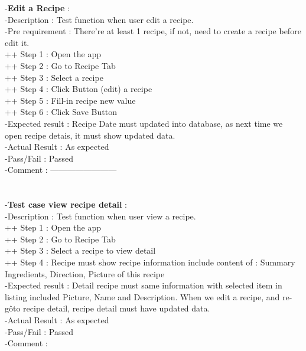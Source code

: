\documentclass{article}
\begin{document}
        -\textbf{Edit a Recipe }: \\
        -Description : Test function when user edit a recipe. \\
        -Pre requirement : There're at least 1 recipe, if not, need to create a recipe before edit it. \\
        ++ Step 1 : Open the app  \\
        ++ Step 2 : Go to Recipe Tab \\
        ++ Step 3 : Select a recipe  \\
        ++ Step 4 : Click Button (edit) a recipe \\
        ++ Step 5 : Fill-in recipe new value \\
        ++ Step 6 : Click Save Button \\
        -Expected result : Recipe Date must updated into database, as next time we open recipe detais, it must show updated data. \\
        -Actual Result : As expected \\
        -Pass/Fail : Passed \\
        -Comment : 
        ------------------------\\ \\ \\
        -\textbf{Test case view recipe detail }: \\
        -Description : Test function when user view a recipe. \\
        ++ Step 1 : Open the app  \\
        ++ Step 2 : Go to Recipe Tab \\
        ++ Step 3 : Select a recipe to view detail  \\
        ++ Step 4 : Recipe must show recipe information include content of : Summary Ingredients, Direction, Picture of this recipe\\
        -Expected result : Detail recipe must same information with selected item in listing included Picture, Name and Description. When we edit a recipe, and re-gôto recipe detail, recipe detail must have updated data. \\
        -Actual Result : As expected \\
        -Pass/Fail : Passed \\
        -Comment : 
\end{document}
